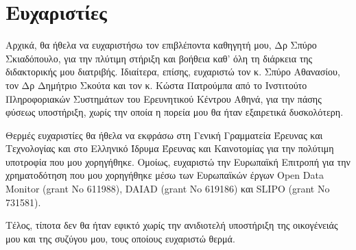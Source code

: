 \chapter*{Ευχαριστίες}
 
Αρχικά, θα ήθελα να ευχαριστήσω τον επιβλέποντα καθηγητή μου, Δρ Σπύρο Σκιαδόπουλο, για την πλύτιμη στήριξη και βοήθεια καθ' όλη τη διάρκεια της διδακτορικής μου διατριβής. Ιδιαίτερα, επίσης, ευχαριστώ τον κ. Σπύρο Αθανασίου, τον Δρ Δημήτριο Σκούτα και τον κ. Κώστα Πατρούμπα από το Ινστιτούτο Πληροφοριακών Συστημάτων του Ερευνητικού Κέντρου Αθηνά, για την πάσης φύσεως υποστήριξη, χωρίς την οποία η πορεία μου θα ήταν εξαιρετικά δυσκολότερη.

Θερμές ευχαριστίες θα ήθελα να εκφράσω στη Γενική Γραμματεία Έρευνας και Τεχνολογίας και στο Ελληνικό Ίδρυμα Έρευνας και Καινοτομίας για την πολύτιμη υποτροφία που μου χορηγήθηκε. Ομοίως, ευχαριστώ την Ευρωπαϊκή Επιτροπή για την χρηματοδότηση που μου χορηγήθηκε μέσω των Ευρωπαϊκών έργων Open Data Monitor (grant No 611988), DAIAD (grant No 619186) και SLIPO (grant No 731581).

Τέλος, τίποτα δεν θα ήταν εφικτό χωρίς την ανιδιοτελή υποστήριξη της οικογένειάς μου και της συζύγου μου, τους οποίους ευχαριστώ θερμά.